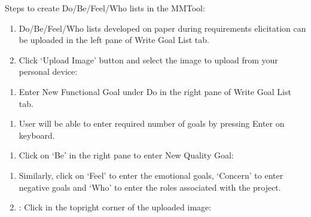 \documentclass[letterpaper,10pt,english]{jupyterBook}
\begin{document}
\sphinxAtStartPar
Steps to create Do/Be/Feel/Who lists in the MMTool:
\begin{enumerate}
%
\item {} 
\sphinxAtStartPar
Do/Be/Feel/Who lists developed on paper during requirements
elicitation can be uploaded in the left pane of Write Goal List tab.

\item {} 
\sphinxAtStartPar
Click ‘Upload Image’ button and select the image to upload from your
personal device:

\end{enumerate}

\sphinxAtStartPar
{}
\begin{enumerate}
%
\item {} 
\sphinxAtStartPar
Enter New Functional Goal under Do in the right pane of Write Goal
List tab.

\end{enumerate}

\sphinxAtStartPar
{}
\begin{enumerate}
%
\item {} 
\sphinxAtStartPar
User will be able to enter required number of goals by pressing
Enter on keyboard.

\end{enumerate}

\sphinxAtStartPar
{}
\begin{enumerate}
%
\item {} 
\sphinxAtStartPar
Click on ‘Be’ in the right pane to enter New Quality Goal:

\end{enumerate}

\sphinxAtStartPar
{}
\begin{enumerate}
%
\item {} 
\sphinxAtStartPar
Similarly, click on ‘Feel’ to enter the emotional goals, ‘Concern’
to enter negative goals and ‘Who’ to enter the roles associated with
the project.

\item {} 
\sphinxAtStartPar
{}: Click  in the top\sphinxhyphen{}right
corner of the uploaded image:

\end{enumerate}
\end{document}
